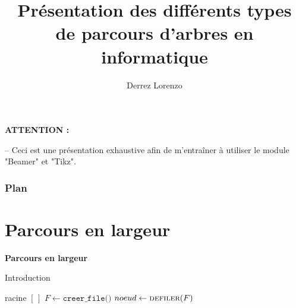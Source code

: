 \documentclass{beamer}
\title{\textbf{Présentation des différents types de parcours d'arbres en informatique}}
\author{Derrez Lorenzo}
\begin{document}
\begin{frame}{\textbf{ATTENTION :}}
    \begin{center}
        \qquad -- Ceci est une présentation exhaustive afin de m'entraîner à utiliser le module "Beamer" et "Tikz".
    \end{center}
\end{frame}

\begin{frame}
    \maketitle
    \centering
\end{frame}

\begin{frame}
    \frametitle{Plan}
    \tableofcontents
\end{frame}

\section{Parcours en largeur}

\begin{frame}{\textbf{Parcours en largeur}}
    \begin{block}{Introduction}
        \begin{algorithm}[H]
            \footnotesize
            \caption{Parcours en largeur}
            \begin{algorithmic}[1]
                \Require racine
                    \State \Return $[\,]$
                \Else
                    \State $F \gets \texttt{creer\_file()}$
                    \State {}
                        \State $noeud \gets \Call{defiler}{F}$
                        \State {}
                            \State {}
                        \EndIf
                            \State {}
                        \EndIf
                    \EndWhile
                \EndIf
            \end{algorithmic}
        \end{algorithm}
    \end{block}
\end{frame}
\end{document}
